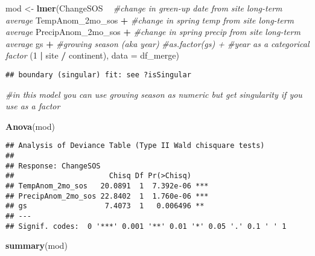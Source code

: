 \documentclass[
]{article}
\newenvironment{Shaded}{\begin{snugshade}}{\end{snugshade}}
\newcommand{\CommentTok}[1]{\textcolor[rgb]{0.56,0.35,0.01}{\textit{#1}}}
\newcommand{\DataTypeTok}[1]{\textcolor[rgb]{0.13,0.29,0.53}{#1}}
\newcommand{\DecValTok}[1]{\textcolor[rgb]{0.00,0.00,0.81}{#1}}
\newcommand{\KeywordTok}[1]{\textcolor[rgb]{0.13,0.29,0.53}{\textbf{#1}}}
\newcommand{\NormalTok}[1]{#1}
\newcommand{\OperatorTok}[1]{\textcolor[rgb]{0.81,0.36,0.00}{\textbf{#1}}}
\newcommand{\StringTok}[1]{\textcolor[rgb]{0.31,0.60,0.02}{#1}}
\begin{document}
\begin{Shaded}
\begin{Highlighting}[]
\NormalTok{mod <-}\StringTok{ }\KeywordTok{lmer}\NormalTok{(ChangeSOS }\OperatorTok{~}\StringTok{ }\CommentTok{#change in green-up date from site long-term average}
\StringTok{              }\NormalTok{TempAnom_2mo_sos }\OperatorTok{+}\StringTok{ }\CommentTok{#change in spring temp from site long-term average}
\StringTok{              }\NormalTok{PrecipAnom_2mo_sos }\OperatorTok{+}\StringTok{ }\CommentTok{#change in spring precip from site long-term average}
\StringTok{              }\NormalTok{gs }\OperatorTok{+}\StringTok{ }\CommentTok{#growing season (aka year)}
\StringTok{              }\CommentTok{#as.factor(gs) + #year as a categorical factor}
\StringTok{              }\NormalTok{(}\DecValTok{1} \OperatorTok{|}\StringTok{ }\NormalTok{site }\OperatorTok{/}\StringTok{ }\NormalTok{continent),}
            \DataTypeTok{data =}\NormalTok{ df_merge)}
\end{Highlighting}
\end{Shaded}

\begin{verbatim}
## boundary (singular) fit: see ?isSingular
\end{verbatim}

\begin{Shaded}
\begin{Highlighting}[]
     \CommentTok{#in this model you can use growing season as numeric but get singularity if you use as a factor}


\KeywordTok{Anova}\NormalTok{(mod)}
\end{Highlighting}
\end{Shaded}

\begin{verbatim}
## Analysis of Deviance Table (Type II Wald chisquare tests)
## 
## Response: ChangeSOS
##                      Chisq Df Pr(>Chisq)    
## TempAnom_2mo_sos   20.0891  1  7.392e-06 ***
## PrecipAnom_2mo_sos 22.8402  1  1.760e-06 ***
## gs                  7.4073  1   0.006496 ** 
## ---
## Signif. codes:  0 '***' 0.001 '**' 0.01 '*' 0.05 '.' 0.1 ' ' 1
\end{verbatim}

\begin{Shaded}
\begin{Highlighting}[]
\KeywordTok{summary}\NormalTok{(mod)}
\end{Highlighting}
\end{Shaded}
\end{document}

